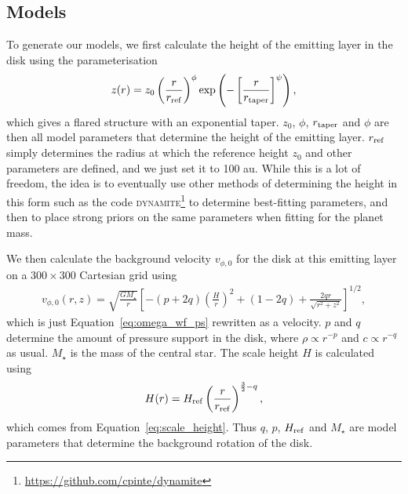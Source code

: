 \subsection{Models}

To generate our models, we first calculate the height of the emitting layer in the disk using the parameterisation \citep{pinte2018}
\begin{align}
    z(r) = z_0 \left( \frac{r}{r_{\rm ref}} \right)^\phi \exp \left( -\left[ \frac{r}{r_\mathrm{taper}} \right]^{\psi} \right), \label{eq:height}
\end{align}
which gives a flared structure with an exponential taper. $z_0$, $\phi$, $r_{\rm taper}$ and $\phi$ are then all model parameters that determine the height of the emitting layer. 
$r_{\rm ref}$ simply determines the radius at which the reference height $z_0$ and other parameters are defined, and we just set it to 100 au.
While this is a lot of freedom, the idea is to eventually use other methods of determining the height in this form such as the code \textsc{dynamite}\footnote{\url{https://github.com/cpinte/dynamite}} \citep{pinte2018} to determine best-fitting parameters, and then to place strong priors on the same parameters when fitting for the planet mass.

We then calculate the background velocity $v_{\phi,\mathrm{0}}$ for the disk at this emitting layer on a $300 \times 300$ Cartesian grid using
\begin{align}
    v_{\phi,\mathrm{0}}(r,z) = \sqrt{\frac{G M_\star}{r}} \left[ - \left(p + 2q\right) \left( \frac{H}{r} \right)^2 + \left( 1-2q \right) + \frac{2qr}{\sqrt{r^2 + z^2}}\right]^{1/2}, \label{eq:omega_wf_ps_full}
\end{align}
which is just Equation~\ref{eq:omega_wf_ps} rewritten as a velocity.
$p$ and $q$ determine the amount of pressure support in the disk, where $\rho \propto r^{-p}$ and $c \propto r^{-q}$ as usual.
$M_\star$ is the mass of the central star.
The scale height $H$ is calculated using
\begin{align}
    H(r) = H_{\rm ref} \left( \frac{r}{r_{\rm ref}} \right)^{\frac{3}{2} - q},
\end{align}
which comes from Equation~\ref{eq:scale_height}.
Thus $q$, $p$, $H_{\rm ref}$ and $M_\star$ are model parameters that determine the background rotation of the disk.

